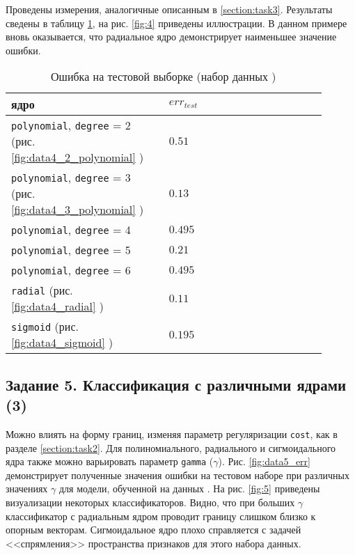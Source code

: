 \documentclass[a4paper,12pt]{article} %
\begin{document}
Проведены измерения, аналогичные описанным в \ref{section:task3}. Результаты сведены в таблицу \ref{table:4}, на рис. \ref{fig:4} приведены иллюстрации. В данном примере вновь оказывается, что радиальное ядро демонстрирует наименьшее значение ошибки.

\begin{table}[H]
    \caption{Ошибка на тестовой выборке (набор данных )}
    \begin{tabular}{m{0.45\linewidth} | m{0.45\linewidth}}
        \hline \hline
        ядро & $err_{test}$ \\
        \hline
        \texttt{polynomial}, \texttt{degree} = 2 (рис. \ref{fig:data4_2_polynomial} ) & $ 0.51 $ \\
        \texttt{polynomial}, \texttt{degree} = 3 (рис. \ref{fig:data4_3_polynomial} ) & $ 0.13 $ \\
        \texttt{polynomial}, \texttt{degree} = 4  & $ 0.495 $ \\
        \texttt{polynomial}, \texttt{degree} = 5  & $ 0.21 $ \\
        \texttt{polynomial}, \texttt{degree} = 6  & $ 0.495 $ \\
        \texttt{radial} (рис. \ref{fig:data4_radial} ) & $ 0.11 $ \\
        \texttt{sigmoid} (рис. \ref{fig:data4_sigmoid} ) & $ 0.195 $ \\
        \hline
    \end{tabular}
    \label{table:4}
\end{table}

\subsection{Задание 5. Классификация с различными ядрами (3)}

Можно влиять на форму границ, изменяя параметр регуляризации \texttt{cost}, как в разделе \ref{section:task2}.
Для полиномиального, радиального и сигмоидального ядра также можно варьировать параметр \texttt{gamma} ($\gamma$).
Рис. \ref{fig:data5_err} демонстрирует полученные значения ошибки на тестовом наборе при различных значениях $ \gamma $ для модели, обученной на данных . На рис. \ref{fig:5} приведены визуализации некоторых классификаторов. Видно, что при больших $ \gamma $ классификатор с радиальным ядром проводит границу слишком близко к опорным векторам.
Сигмоидальное ядро плохо справляется с задачей <<спрямления>> пространства признаков для этого набора данных.
\end{document}
